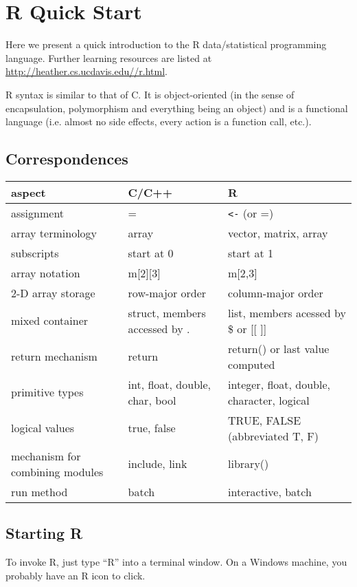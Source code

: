 \chapter{R Quick Start}
\label{chap:rquickstart}

Here we present a quick introduction to the R data/statistical
programming language.  Further learning resources are listed at
\url{http://heather.cs.ucdavis.edu//r.html}.

R syntax is similar to that of C. It is object-oriented (in the sense of
encapsulation, polymorphism and everything being an object) and is a
functional language (i.e. almost no side effects, every action is a
function call, etc.).

\section{Correspondences}

\begin{tabular}{|l|l|l|}
\hline
aspect & C/C++ & R \\ \hline 
\hline
assignment & = & \verb#<-# (or =) \\ \hline 
array terminology & array & vector, matrix, array \\ \hline 
subscripts & start at 0 & start at 1 \\ \hline
array notation & m[2][3] & m[2,3] \\ \hline 
2-D array storage & row-major order & column-major order \\ \hline 
mixed container &struct, members accessed by . & list, members acessed by
\$ or [[ ]] \\ \hline 
return mechanism & return & return() or last value computed \\ \hline
primitive types & int, float, double, char, bool & integer, float,
double, character, logical \\ \hline
logical values & true, false & TRUE, FALSE (abbreviated T, F) \\ \hline
mechanism for combining modules & include, link & library() \\ \hline
run method & batch & interactive, batch \\ \hline
\end{tabular}

\section{Starting R}

To invoke R, just type ``R'' into a terminal window. On a Windows
machine, you probably have an R icon to click.  

